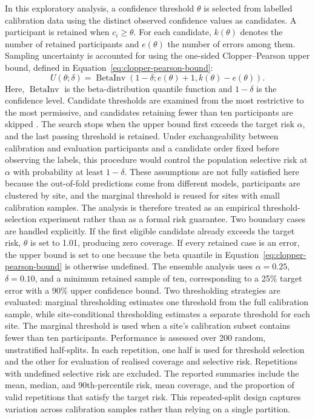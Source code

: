 In this exploratory analysis, a confidence threshold $\theta$ is selected from labelled calibration data using the distinct observed confidence values as candidates. A participant is retained when $c_i\geq\theta$. For each candidate, $k(\theta)$ denotes the number of retained participants and $e(\theta)$ the number of errors among them. Sampling uncertainty is accounted for using the one-sided Clopper--Pearson upper bound, defined in Equation~\eqref{eq:clopper-pearson-bound}:
\begin{equation}
U(\theta;\delta)
=
\operatorname{BetaInv}
\left(
1-\delta;
e(\theta)+1,
k(\theta)-e(\theta)
\right).
\label{eq:clopper-pearson-bound}
\end{equation}
Here, $\operatorname{BetaInv}$ is the beta-distribution quantile function and $1-\delta$ is the confidence level. Candidate thresholds are examined from the most restrictive to the most permissive, and candidates retaining fewer than ten participants are skipped \citep{Angelopoulosetal2021,AngelopoulosBates2023}. The search stops when the upper bound first exceeds the target risk $\alpha$, and the last passing threshold is retained. Under exchangeability between calibration and evaluation participants and a candidate order fixed before observing the labels, this procedure would control the population selective risk at $\alpha$ with probability at least $1-\delta$. These assumptions are not fully satisfied here because the out-of-fold predictions come from different models, participants are clustered by site, and the marginal threshold is reused for sites with small calibration samples. The analysis is therefore treated as an empirical threshold-selection experiment rather than as a formal risk guarantee. Two boundary cases are handled explicitly. If the first eligible candidate already exceeds the target risk, $\theta$ is set to 1.01, producing zero coverage. If every retained case is an error, the upper bound is set to one because the beta quantile in Equation~\eqref{eq:clopper-pearson-bound} is otherwise undefined. The ensemble analysis uses $\alpha=0.25$, $\delta=0.10$, and a minimum retained sample of ten, corresponding to a 25\% target error with a 90\% upper confidence bound. Two thresholding strategies are evaluated: marginal thresholding estimates one threshold from the full calibration sample, while site-conditional thresholding estimates a separate threshold for each site. The marginal threshold is used when a site's calibration subset contains fewer than ten participants. Performance is assessed over 200 random, unstratified half-splits. In each repetition, one half is used for threshold selection and the other for evaluation of realised coverage and selective risk. Repetitions with undefined selective risk are excluded. The reported summaries include the mean, median, and 90th-percentile risk, mean coverage, and the proportion of valid repetitions that satisfy the target risk. This repeated-split design captures variation across calibration samples rather than relying on a single partition.


